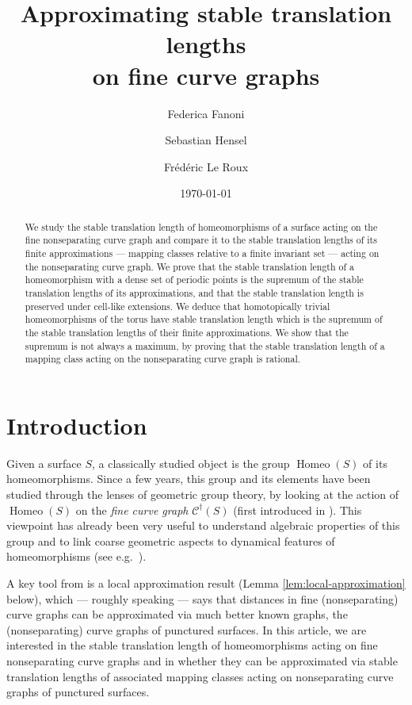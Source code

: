 \documentclass{amsart}
\title[Approximating stable translation lengths on fine curve graphs]{Approximating stable translation lengths\\ on fine curve graphs}
\author{Federica Fanoni}
\author{Sebastian Hensel}
\author{Frédéric Le Roux}
\date{\today}
\newcommand{\C}{\mathcal{C}}
\newcommand{\Cdagger}{\C^\dagger}
\DeclareMathOperator{\Homeo}{Homeo}
\theoremstyle{definition}
\begin{document}
\begin{abstract}
We study the stable translation length of homeomorphisms of a surface acting on the fine nonseparating curve graph and compare it to the stable translation lengths of its finite approximations --- mapping classes relative to a finite invariant set --- acting on the nonseparating curve graph. We prove that the stable translation length of a homeomorphism with a dense set of periodic points is the supremum of the stable translation lengths of its approximations, and that the stable translation length is preserved under cell-like extensions. We deduce that homotopically trivial homeomorphisms of the torus have stable translation length which is the supremum of the stable translation lengths of their finite approximations. We show that the supremum is not always a maximum, by proving that the stable translation length of a mapping class acting on the nonseparating curve graph is rational.
\end{abstract}

\maketitle

\section{Introduction}

Given a surface \(S\), a classically studied object is the group \(\Homeo(S)\) of its homeomorphisms. Since a few years, this group and its elements have been studied through the lenses of geometric group theory, by looking at the action of \(\Homeo(S)\) on the \emph{fine curve graph} \(\Cdagger(S)\) (first introduced in \cite{bhw_quasi}). This viewpoint has already been very useful to understand algebraic properties of this group and to link coarse geometric aspects to dynamical features of homeomorphisms (see e.g.\ \cite{bhw_quasi, bhmmw_rotation, gm_parabolic, gm_hyperbolic, einabadi_torus, bhw_towards}).

A key tool from \cite{bhw_quasi} is a local approximation result (Lemma \ref{lem:local-approximation} below), which --- roughly speaking --- says that distances in fine (nonseparating) curve graphs can be approximated via much better known graphs, the (nonseparating) curve graphs of punctured surfaces. In this article, we are interested in the stable translation length of homeomorphisms acting on fine nonseparating curve graphs and in whether they can be approximated via stable translation lengths of associated mapping classes acting on nonseparating curve graphs of punctured surfaces.
\end{document}
